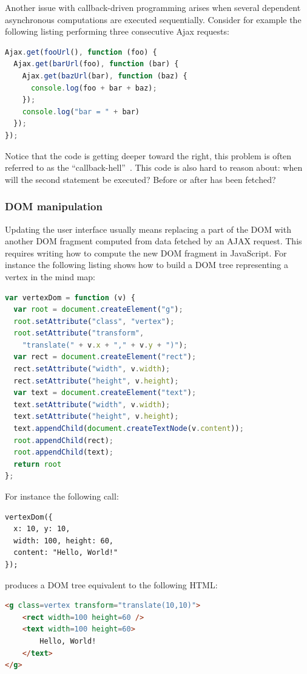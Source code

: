\documentclass[american,english,runningheads]{llncs}
\begin{document}
Another issue with callback-driven programming arises when several dependent asynchronous computations are executed
sequentially. Consider for example the following listing performing three consecutive Ajax requests:

\begin{lstlisting}[language=JavaScript,label=async-callback-hell,caption=Sequential asynchronous calls]
Ajax.get(fooUrl(), function (foo) {
  Ajax.get(barUrl(foo), function (bar) {
    Ajax.get(bazUrl(bar), function (baz) {
      console.log(foo + bar + baz);
    });
    console.log("bar = " + bar)
  });
});
\end{lstlisting}

Notice that the code is getting deeper toward the right, this problem is often referred to as the
“callback-hell”~\cite{McKenna_Roy}. This code is also hard to reason about: when will the second 
statement be executed? Before or after  has been fetched?

\subsubsection{DOM manipulation}
\label{forest}

Updating the user interface usually means replacing a part of the DOM with another DOM fragment computed from data
fetched by an AJAX request. This requires writing how to compute the new DOM fragment in JavaScript. For instance
the following listing shows how to build a DOM tree representing a vertex in the mind map:

\begin{lstlisting}[language=JavaScript,label=dom-api,caption=DOM fragment creation using the native API]
var vertexDom = function (v) {
  var root = document.createElement("g");
  root.setAttribute("class", "vertex");
  root.setAttribute("transform",
    "translate(" + v.x + "," + v.y + ")");
  var rect = document.createElement("rect");
  rect.setAttribute("width", v.width);
  rect.setAttribute("height", v.height);
  var text = document.createElement("text");
  text.setAttribute("width", v.width);
  text.setAttribute("height", v.height);
  text.appendChild(document.createTextNode(v.content));
  root.appendChild(rect);
  root.appendChild(text);
  return root
};
\end{lstlisting}

For instance the following call:
\begin{lstlisting}
vertexDom({
  x: 10, y: 10,
  width: 100, height: 60,
  content: "Hello, World!"
});
\end{lstlisting}
produces a DOM tree equivalent to the following HTML:
\begin{lstlisting}[language=HTML]
<g class=vertex transform="translate(10,10)">
    <rect width=100 height=60 />
    <text width=100 height=60>
        Hello, World!
    </text>
</g>
\end{lstlisting}
\end{document}
